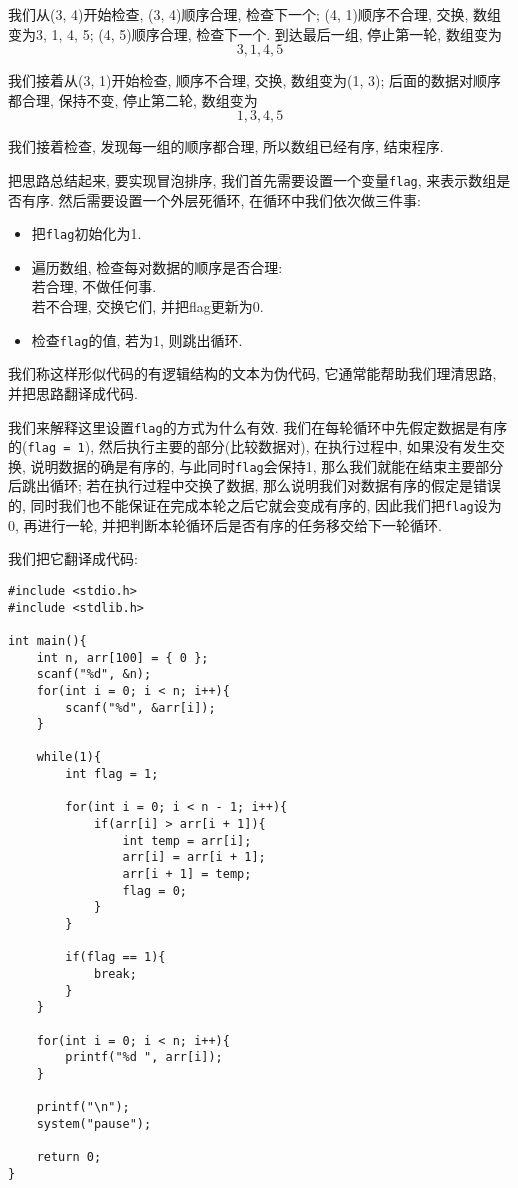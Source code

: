             我们从(3, 4)开始检查, (3, 4)顺序合理, 检查下一个; (4, 1)顺序不合理, 交换, 数组变为3, 1, 4, 5; (4, 5)顺序合理, 检查下一个. 到达最后一组, 停止第一轮, 数组变为
                \[ 3, 1, 4, 5 \]

            我们接着从(3, 1)开始检查, 顺序不合理, 交换, 数组变为(1, 3); 后面的数据对顺序都合理, 保持不变, 停止第二轮, 数组变为
                \[ 1, 3, 4, 5 \]

            我们接着检查, 发现每一组的顺序都合理, 所以数组已经有序, 结束程序.

            把思路总结起来, 要实现冒泡排序, 我们首先需要设置一个变量\texttt{flag}, 来表示数组是否有序. 然后需要设置一个外层死循环, 在循环中我们依次做三件事:
            \begin{itemize}
                \item 把\texttt{flag}初始化为1.
                \item 遍历数组, 检查每对数据的顺序是否合理: \\
                      若合理, 不做任何事. \\
                      若不合理, 交换它们, 并把flag更新为0. 
                \item 检查\texttt{flag}的值, 若为1, 则跳出循环.
            \end{itemize}

            我们称这样形似代码的有逻辑结构的文本为伪代码, 它通常能帮助我们理清思路, 并把思路翻译成代码.

            我们来解释这里设置\texttt{flag}的方式为什么有效. 我们在每轮循环中先假定数据是有序的(\texttt{flag = 1}), 然后执行主要的部分(比较数据对), 在执行过程中, 如果没有发生交换, 说明数据的确是有序的, 与此同时\texttt{flag}会保持1, 那么我们就能在结束主要部分后跳出循环; 若在执行过程中交换了数据, 那么说明我们对数据有序的假定是错误的, 同时我们也不能保证在完成本轮之后它就会变成有序的, 因此我们把\texttt{flag}设为0, 再进行一轮, 并把判断本轮循环后是否有序的任务移交给下一轮循环.

            我们把它翻译成代码:
\begin{lstlisting}
#include <stdio.h>
#include <stdlib.h>

int main(){
    int n, arr[100] = { 0 };
    scanf("%d", &n);
    for(int i = 0; i < n; i++){
        scanf("%d", &arr[i]);
    }

    while(1){
        int flag = 1;

        for(int i = 0; i < n - 1; i++){
            if(arr[i] > arr[i + 1]){
                int temp = arr[i];
                arr[i] = arr[i + 1];
                arr[i + 1] = temp;
                flag = 0;
            }
        }

        if(flag == 1){
            break;
        }
    }

    for(int i = 0; i < n; i++){
        printf("%d ", arr[i]);
    }

    printf("\n");
    system("pause");

    return 0;
}
\end{lstlisting}

